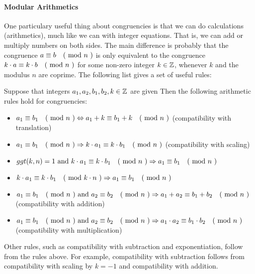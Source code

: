 \paragraph{Modular Arithmetics}
One particulary useful thing about congruencies is that we can do calculations (arithmetics), much like we can with integer equations. That is, we can add or multiply numbers on both sides. The main difference is probably that the congruence $a \equiv b \quad \text{( mod } n \text{ )}$ is only equivalent to the congruence $k\cdot a \equiv k\cdot b \quad \text{( mod } n \text{ )}$ for some non-zero integer $k\in \mathbb{Z}$, whenever $k$ and the modulus $n$ are coprime. The following list gives a set of useful rules:

Suppose that integers $a_1,a_2,b_1,b_2, k\in\mathbb{Z}$ are given Then the following arithmetic rules hold for congruencies:
\begin{itemize}
\item $a_1 \equiv b_1 \quad \text{( mod } n \text{ )}\Leftrightarrow a_1+k \equiv b_1+k \quad \text{( mod } n \text{ )}$ (compatibility with translation)
\item $a_1 \equiv b_1 \quad \text{( mod } n \text{ )}\Rightarrow k\cdot a_1 \equiv k\cdot b_1 \quad \text{( mod } n \text{ )}$ (compatibility with scaling)
\item $ggt(k,n)=1 \text{ and } k\cdot a_1 \equiv k\cdot b_1 \quad \text{( mod } n \text{ )}\Rightarrow a_1 \equiv b_1 \quad \text{( mod } n \text{ )}$
\item $k\cdot a_1 \equiv k\cdot b_1 \quad \text{( mod } k\cdot n \text{ )}\Rightarrow a_1 \equiv b_1 \quad \text{( mod } n \text{ )}$
\item $a_1 \equiv b_1 \quad \text{( mod } n \text{ )}\text{ and } a_2 \equiv b_2 \quad \text{( mod } n \text{ )}\Rightarrow a_1+a_2 \equiv b_1+b_2 \quad \text{( mod } n \text{ )}$ (compatibility with addition)
\item $a_1 \equiv b_1 \quad \text{( mod } n \text{ )}\text{ and } a_2 \equiv b_2 \quad \text{( mod } n \text{ )}\Rightarrow a_1\cdot a_2 \equiv b_1\cdot b_2 \quad \text{( mod } n \text{ )}$ (compatibility with multiplication)
\end{itemize}
Other rules, such as compatibility with subtraction and exponentiation, follow from the rules above. For example, compatibility with subtraction follows from compatibility with scaling by $k=-1$ and compatibility with addition.

